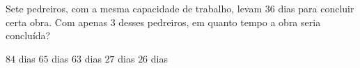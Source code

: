 Sete pedreiros, com a mesma capacidade de trabalho, levam $36$ dias para concluir certa obra. Com apenas $3$ desses pedreiros, em quanto tempo a obra seria concluída?

$84$ dias
$65$ dias
$63$ dias
$27$ dias
$26$ dias



